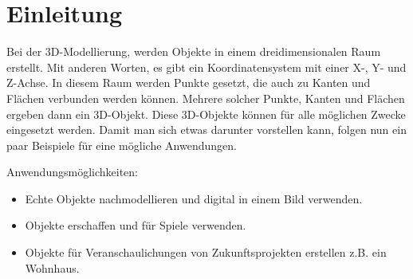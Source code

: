 \section{Einleitung}
Bei der 3D-Modellierung, werden Objekte in einem dreidimensionalen Raum erstellt. Mit anderen Worten, es gibt ein Koordinatensystem mit einer X-, Y- und Z-Achse.
In diesem Raum werden Punkte gesetzt, die auch zu Kanten und Flächen verbunden werden können. Mehrere solcher Punkte, Kanten und Flächen ergeben dann ein 3D-Objekt.
Diese 3D-Objekte können für alle möglichen Zwecke eingesetzt werden. Damit man sich etwas darunter vorstellen kann, folgen nun ein paar Beispiele für
eine mögliche Anwendungen.

Anwendungsmöglichkeiten:
\begin{itemize}
    \item Echte Objekte nachmodellieren und digital in einem Bild verwenden.
    \item Objekte erschaffen und für Spiele verwenden.
    \item Objekte für Veranschaulichungen von Zukunftsprojekten erstellen z.B. ein Wohnhaus.
\end{itemize}
